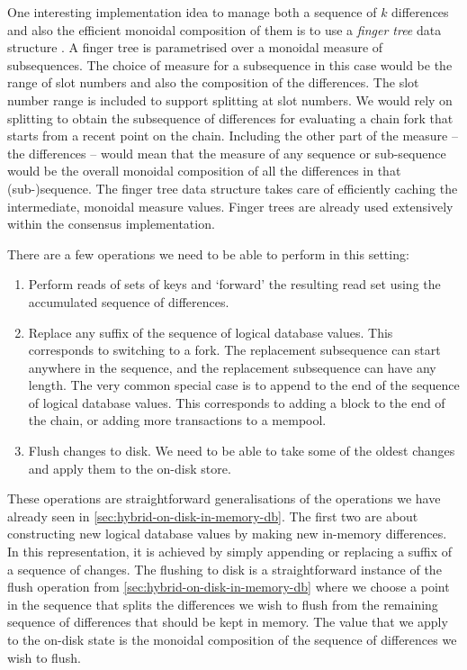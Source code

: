 \documentclass[11pt,a4paper]{article}
\begin{document}
One interesting implementation idea to manage both a sequence of $k$ differences
and also the efficient monoidal composition of them is to use a \emph{finger
tree} data structure \citep{fingertree}. A finger tree is parametrised over a
monoidal measure of subsequences. The choice of measure for a subsequence in
this case would be the range of slot numbers and also the composition of the
differences. The slot number range is included to support splitting at slot numbers. We
would rely on splitting to obtain the subsequence of differences for
evaluating a chain fork that starts from a recent point on the chain. Including the other
part of the measure -- the differences -- would mean that the measure of any
sequence or sub-sequence would be the overall monoidal composition of all the
differences in that (sub-)sequence. The finger tree data structure takes care
of efficiently caching the intermediate, monoidal measure values. Finger trees are
already used extensively within the consensus implementation.

There are a few operations we need to be able to perform in this setting:
\begin{enumerate}
\item Perform reads of sets of keys and `forward' the resulting read set
      using the accumulated sequence of differences.
\item Replace any suffix of the sequence of logical database values. This
      corresponds to switching to a fork. The replacement subsequence can
      start anywhere in the sequence, and the replacement subsequence can have any length.
      The very common special case
      is to append to the end of the sequence of logical database values.
      This corresponds to adding a block to the end of the chain, or adding
      more transactions to a mempool.
\item Flush changes to disk. We need to be able to take some of the oldest
      changes and apply them to the on-disk store.
\end{enumerate}
These operations are straightforward generalisations of the operations we have
already seen in \cref{sec:hybrid-on-disk-in-memory-db}. The first two are about
constructing new logical database values by making new in-memory differences.
In this representation, it is achieved by simply appending or replacing a suffix of a
sequence of changes. The flushing to disk is a straightforward instance of the
flush operation from \cref{sec:hybrid-on-disk-in-memory-db} where we choose
a point in the sequence that splits the differences we wish to flush from the
remaining sequence of differences that should be kept in memory. The value that we apply to the on-disk state
is the monoidal composition of the sequence of differences we wish to flush.
\end{document}
